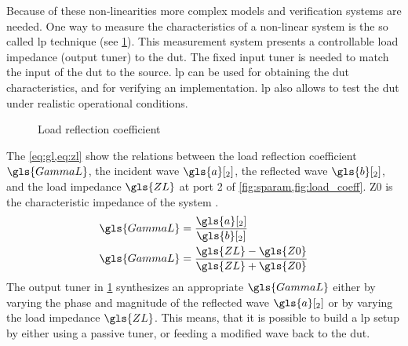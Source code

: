 \documentclass[12pt,a4paper,parskip=full,abstract=true,BCOR=12mm,twoside,open=right]{scrreprt}
\begin{document}
Because of these non-linearities more complex models and verification systems are
needed. One way to measure the characteristics of a non-linear system is the so called
\gls{lp} technique (see \cref{fig:load_coeff}). This measurement system presents a
controllable load impedance (output tuner) to the \gls{dut}. The fixed input tuner is
needed to match the input of the \gls{dut} to the source. \Gls{lp} can be used for obtaining the
\gls{dut} characteristics, and for verifying an implementation. \Gls{lp} also
allows to test the \gls{dut} under realistic operational conditions.

\begin{figure}[htb]
    \centering
    \caption{Load reflection coefficient}
    \label{fig:load_coeff}
\end{figure}

The \cref{eq:gl,eq:zl} show the relations between the load reflection coefficient $\gls{GammaL}$,
the incident wave $\gls{a}[_2]$, the reflected
wave $\gls{b}[_2]$, and the load impedance $\gls{ZL}$ at port 2 of \cref{fig:sparam,fig:load_coeff}. \gls{Z0}
is the characteristic impedance of the system \cite{hashmi_highly_2011}.
\begin{align}
    \label{eq:gl} \gls{GammaL} & = \frac{\gls{a}[_2]}{\gls{b}[_2]} \\
    \label{eq:zl} \gls{GammaL} & = \frac{\gls{ZL}-\gls{Z0}}{\gls{ZL}+\gls{Z0}}
\end{align}
The output tuner in \cref{fig:load_coeff} synthesizes an appropriate $\gls{GammaL}$
either by varying the phase and magnitude of the reflected wave $\gls{a}[_2]$ or by varying
the load impedance $\gls{ZL}$. This means, that it is possible to build a \gls{lp}
setup by either using a passive tuner, or feeding a modified wave back to the
\gls{dut}.
\end{document}
